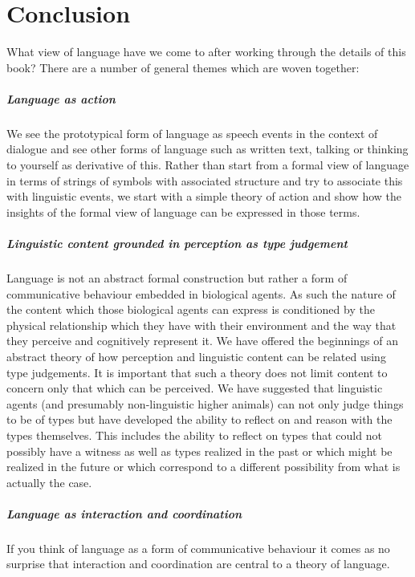 \chapter*{Conclusion}
\label{ch:conclusion}

What view of language have we come to after working through the
details of this book?
There are a number of general themes which are woven together:

\paragraph{Language as action} We see the prototypical form of
language as speech events in the context of dialogue and see other
forms of language such as written text, talking or thinking to
yourself as derivative of this.  Rather than start from a formal view
of language in terms of strings of symbols with associated structure
and try to associate this with linguistic events, we start with a
simple theory of action and show how the insights of the formal view
of language can be expressed in those terms.
 
\paragraph{Linguistic content grounded in perception as type
  judgement}  Language is not an abstract formal construction but
rather a form of communicative behaviour embedded in biological
agents.  As such the nature of the content which those biological
agents can express is conditioned by the physical relationship which
they have with their environment and the way that they
perceive and cognitively represent it.  We have offered
the beginnings of an abstract theory of how perception and linguistic
content can be related using type judgements.  It is important that
such a theory does not limit content to concern only that which can be
perceived.  We have suggested that linguistic agents (and presumably
non-linguistic higher animals) can not only judge things to be of
types but have developed the ability to reflect on and reason with the types themselves.  This
includes the ability to reflect on types that could not possibly have
a witness as well as types realized in the past or which might be
realized in the future or which correspond to a different possibility
from what is actually the case.

\paragraph{Language as interaction and coordination}  If you think of
language as a form of communicative behaviour it comes as no surprise
that interaction and coordination are central to a theory of
language.

